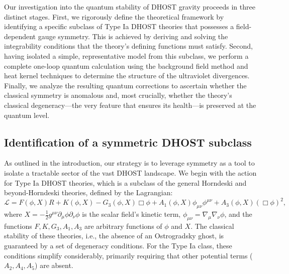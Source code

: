 \documentclass[twocolumn]{aastex631}
\begin{document}
Our investigation into the quantum stability of DHOST gravity proceeds in three distinct stages. First, we rigorously define the theoretical framework by identifying a specific subclass of Type Ia DHOST theories that possesses a field-dependent gauge symmetry. This is achieved by deriving and solving the integrability conditions that the theory's defining functions must satisfy. Second, having isolated a simple, representative model from this subclass, we perform a complete one-loop quantum calculation using the background field method and heat kernel techniques to determine the structure of the ultraviolet divergences. Finally, we analyze the resulting quantum corrections to ascertain whether the classical symmetry is anomalous and, most crucially, whether the theory's classical degeneracy---the very feature that ensures its health---is preserved at the quantum level.

\subsection{Identification of a symmetric DHOST subclass}
As outlined in the introduction, our strategy is to leverage symmetry as a tool to isolate a tractable sector of the vast DHOST landscape. We begin with the action for Type Ia DHOST theories, which is a subclass of the general Horndeski and beyond-Horndeski theories, defined by the Lagrangian:
\begin{equation}
    \mathcal{L} = F(\phi, X) R + K(\phi, X) - G_3(\phi, X) \Box\phi + A_1(\phi, X) \phi_{\mu\nu}\phi^{\mu\nu} + A_3(\phi, X) (\Box\phi)^2,
\end{equation}
where $X = - \frac{1}{2} g^{\mu\nu} \partial_\mu \phi \partial_\nu \phi$ is the scalar field's kinetic term, $\phi_{\mu\nu} = \nabla_\mu \nabla_\nu \phi$, and the functions $F, K, G_3, A_1, A_3$ are arbitrary functions of $\phi$ and $X$. The classical stability of these theories, i.e., the absence of an Ostrogradsky ghost, is guaranteed by a set of degeneracy conditions. For the Type Ia class, these conditions simplify considerably, primarily requiring that other potential terms ($A_2, A_4, A_5$) are absent.
\end{document}
